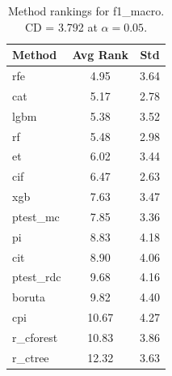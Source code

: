 \begin{table}[h]
\centering
\caption{Method rankings for f1_macro. CD = 3.792 at $\alpha=0.05$.}
\label{tab:ranks_f1_macro}
\begin{tabular}{lcc}
\toprule
Method & Avg Rank & Std \\
\midrule
rfe & 4.95 & 3.64 \\
cat & 5.17 & 2.78 \\
lgbm & 5.38 & 3.52 \\
rf & 5.48 & 2.98 \\
et & 6.02 & 3.44 \\
cif & 6.47 & 2.63 \\
xgb & 7.63 & 3.47 \\
ptest_mc & 7.85 & 3.36 \\
pi & 8.83 & 4.18 \\
cit & 8.90 & 4.06 \\
ptest_rdc & 9.68 & 4.16 \\
boruta & 9.82 & 4.40 \\
cpi & 10.67 & 4.27 \\
r_cforest & 10.83 & 3.86 \\
r_ctree & 12.32 & 3.63 \\
\bottomrule
\end{tabular}
\end{table}